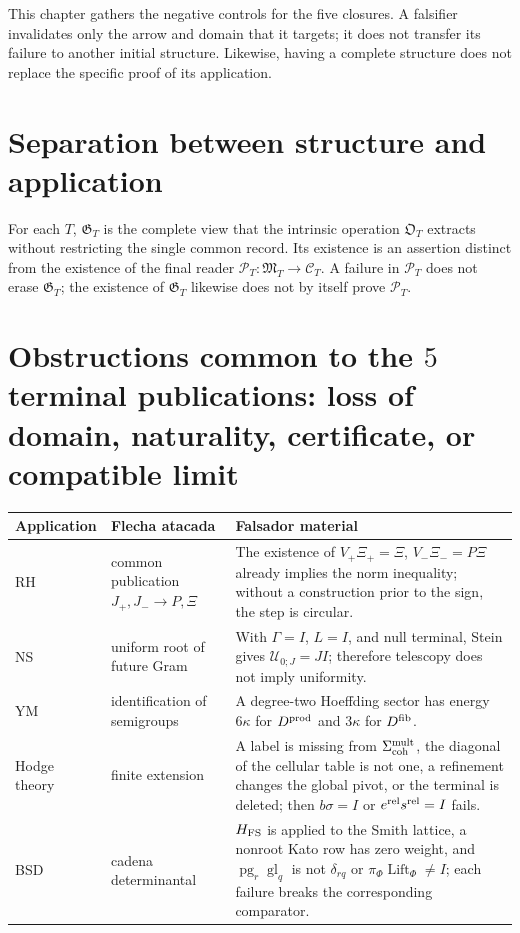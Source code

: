 
This chapter gathers the negative controls for the five closures. A falsifier invalidates only the
arrow and domain that it targets; it does not transfer its failure to another initial structure.
Likewise, having a complete structure does not replace the specific proof
of its application.

\section{Separation between structure and application}

For each $T$, $\mathfrak G_T$ is the complete view that the intrinsic operation
$\mathfrak O_T$ extracts without restricting the single common record.
Its existence is an assertion distinct from the existence of the final reader
$\mathcal P_T:\mathfrak M_T\to\mathcal C_T$. A failure in $\mathcal P_T$ does not
erase $\mathfrak G_T$; the existence of $\mathfrak G_T$ likewise does not by
itself prove $\mathcal P_T$.

\section{Obstructions common to the \(5\) terminal publications: loss of domain, naturality, certificate, or compatible limit}

\begin{center}
\begin{tabular}{p{}p{}p{}}
\hline
Application & Flecha atacada & Falsador material \\
\hline
RH & common publication $J_+,J_-\to P,\Xi$ & The existence of
$V_+\Xi_+=\Xi$, $V_-\Xi_-=P\Xi$ already implies the norm inequality; without a
construction prior to the sign, the step is circular. \\
NS & uniform root of future Gram & With $\Gamma=I$, $L=I$, and null terminal,
Stein gives $\mathcal U_{0;J}=JI$; therefore telescopy does not imply uniformity. \\
YM & identification of semigroups & A degree-two Hoeffding sector has energy $6\kappa$ for $D^{\rm prod}$ and $3\kappa$ for $D^{\rm fib}$. \\
Hodge theory & finite extension & A label is missing from
$\Sigma_{\rm coh}^{\rm mult}$, the diagonal of the cellular table is not one,
a refinement changes the global pivot, or the terminal is deleted; then
$b\sigma=I$ or $e^{\rm rel}s^{\rm rel}=I$ fails. \\
BSD & cadena determinantal & $H_{\rm FS}$ is applied to the Smith lattice, a nonroot Kato row has zero
weight, and $\operatorname{pg}_r\operatorname{gl}_q$ is not $\delta_{rq}$ or $\pi_\Phi\operatorname{Lift}_\Phi\ne I$; each failure
breaks the corresponding comparator. \\
\hline
\end{tabular}
\end{center}


